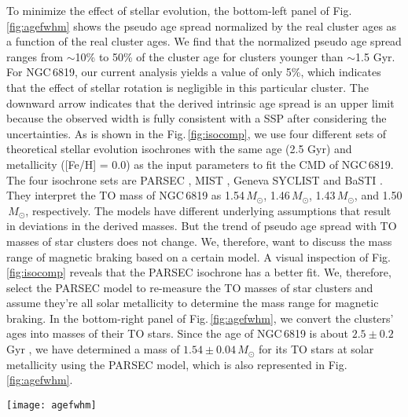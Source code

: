 \documentclass[twocolumn]{aastex631}
\begin{document}
To minimize the effect of stellar evolution, the bottom-left panel of Fig.\,\ref{fig:agefwhm} shows the pseudo age spread normalized by the real cluster ages as a function of the real cluster ages. We find that the normalized pseudo age spread ranges from $\sim$10\% to 50\% of the cluster age for clusters younger than $\sim$1.5 Gyr. For NGC\,6819, our current analysis yields a value of only 5\%, which indicates that the effect of stellar rotation is negligible in this particular cluster. The downward arrow indicates that the derived intrinsic age spread is an upper limit because the observed width is fully consistent with a SSP after considering the uncertainties. 
As is shown in the Fig.\,\ref{fig:isocomp}, we use four different sets of theoretical stellar evolution isochrones with the same age (2.5 Gyr) and metallicity ([Fe/H] = 0.0) as the input parameters to fit the CMD of NGC\,6819. The four isochrone sets are PARSEC \citep{2012MNRAS.427..127B, Marigo2017A}, MIST \citep{2016ApJ...823..102C}, Geneva SYCLIST \citep{2014A&A...566A..21G} and BaSTI \citep{2004ApJ...612..168P}. They interpret the TO mass of NGC\,6819 as 1.54$\,M_\odot$, 1.46$\,M_\odot$, 1.43$\,M_\odot$, and 1.50$\,M_\odot$, respectively. The models have different underlying assumptions that result in deviations in the derived masses. But the trend of pseudo age spread with TO masses of star clusters does not change. We, therefore, want to discuss the mass range of magnetic braking based on a certain model. A visual inspection of Fig.\,\ref{fig:isocomp} reveals that the PARSEC isochrone has a better fit. We, therefore, select the PARSEC model to re-measure the TO masses of star clusters and assume they're all solar metallicity to determine the mass range for magnetic braking. In the bottom-right panel of Fig.\,\ref{fig:agefwhm}, we convert the clusters' ages into masses of their TO stars. Since the age of NGC\,6819 is about $2.5\pm0.2$ Gyr \citep{2013AJ....146...58J}, we have determined a mass of $1.54\pm 0.04 \,M_\odot$ for its TO stars at solar metallicity using the PARSEC model, which is also represented in Fig.\,\ref{fig:agefwhm}.
\begin{figure*}
	\centering
	\texttt{[image: agefwhm]}
	\caption{Top-left: the relation between cluster age and pseudo age spread for clusters with eMSTOs. Blue symbols denote Galactic open clusters \citep{georgy2019disappearance}, while red ones are clusters in the Magellanic Clouds. Different symbols represent results from different studies \citep{goudfrooij2014extended, milone2015multiple, niederhofer2015apparent, bastian2016young, 2017ApJ...846...22G, 2018MNRAS.477.4696M}. NGC\,6819 is marked by a blue-filled star. An arrow indicates an upper limit of the pseudo age spread. Bottom-left: the normalized pseudo age spread as a function of cluster age. Bottom-right: the same as the bottom-left panel but as a function of the mass of TO stars. An error bar of the TO mass of NGC 6819 is also drawn.}
	\label{fig:agefwhm}
\end{figure*}
\end{document}
